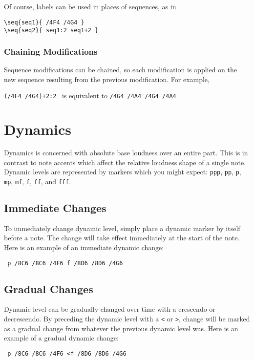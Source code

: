 \documentclass{scrartcl}
\begin{document}
Of course, labels can be used in places of sequences, as in
\begin{tabbing}
  \hspace{1in}\= \verb|\seq{seq1}{ /4F4 /4G4 }| \\
  \> \verb|\seq{seq2}{ seq1:2 seq1+2 }|
\end{tabbing}

\subsubsection{Chaining Modifications}
Sequence modifications can be chained, so each modification is applied on the new sequence resulting from the previous modification. For example,
\begin{center}
\verb|(/4F4 /4G4)+2:2| \ is equivalent to \verb|/4G4 /4A4 /4G4 /4A4|
\end{center}

\section{Dynamics}
Dynamics is concerned with absolute base loudness over an entire part. This is in contrast to note accents which affect the relative loudness shape of a single note. Dynamic levels are represented by markers which you might expect: \verb|ppp|, \verb|pp|, \verb|p|, \verb|mp|, \verb|mf|, \verb|f|, \verb|ff|, and \verb|fff|.

\subsection{Immediate Changes}
To immediately change dynamic level, simply place a dynamic marker by itself before a note. The change will take effect immediately at the start of the note. Here is an example of an immediate dynamic change: \begin{center}
\verb| p /8C6 /8C6 /4F6 f /8D6 /8D6 /4G6 |
\end{center}

\subsection{Gradual Changes}
Dynamic level can be gradually changed over time with a crescendo or decrescendo. By preceding the dynamic level with a \verb|<| or \verb|>|, change will be marked as a gradual change from whatever the previous dynamic level was. Here is an example of a gradual dynamic change:
\begin{center}
\verb| p /8C6 /8C6 /4F6 <f /8D6 /8D6 /4G6 |
\end{center}
\end{document}
